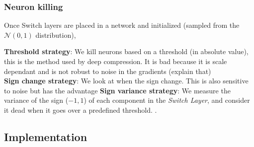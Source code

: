 


\subsubsection{Neuron killing}
Once Switch layers are placed in a network and
initialized (sampled from the $\mathcal{N}(0, 1)$ distribution),

\textbf{Threshold strategy}:  We kill neurons based on a threshold (in absolute
value), this is the method used by deep compression. It is bad because it is
scale dependant and is not robust to noise in the gradients (explain that)
\\ \textbf{Sign change strategy}:  We look at when the sign change. This is also
sensitive to noise but has the advantage
\textbf{Sign variance strategy}: We measure the variance of the sign ($-1, 1$) of each component in the \textit{Switch Layer}, and consider it dead when it goes over a predefined threshold. . 

\subsection{Implementation}

